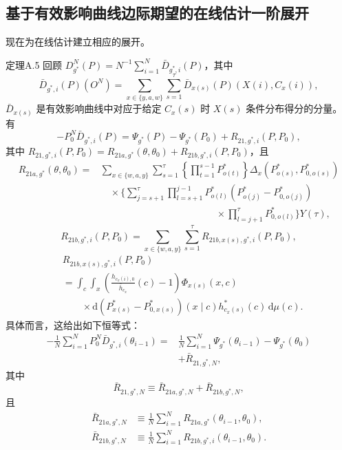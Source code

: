 
\subsection{基于有效影响曲线边际期望的在线估计一阶展开}

现在为在线估计建立相应的展开。

\begin{bookresult}{定理}{A.5}
回顾 $D^N_{g^*}(P)=N^{-1}\sum_{i=1}^N\bar D_{g^*,i}(P)$，其中
\[
\bar D_{g^*,i}(P)(O^N)
 =\sum_{x\in\{y,a,w\}}\sum_{s=1}^{\tau}\bar D_{x(s)}(P)(X(i),C_x(i)),
\]
$\bar D_{x(s)}$ 是有效影响曲线中对应于给定 $C_x(s)$ 时 $X(s)$ 条件分布得分的分量。
有
\[
-P_0^N\bar D_{g^*,i}(P)
 =\Psi_{g^*}(P)-\Psi_{g^*}(P_0)+R_{21,g^*,i}(P,P_0),
\]
其中 $R_{21,g^*,i}(P,P_0)=R_{21a,g^*}(\theta,\theta_0)+R_{21b,g^*,i}(P,P_0)$，且
\[
\begin{aligned}
R_{21a,g^*}(\theta,\theta_0)
={}&\sum_{x\in\{w,a,y\}}\sum_{s=1}^{\tau}
 \left\{\prod_{t=1}^{s-1}P^*_{o(t)}\right\}
 \Delta_x(P^*_{o(s)},P^*_{0,o(s)})\\
&\quad\times\Biggl\{\sum_{j=s+1}^{\tau}
 \prod_{l=s+1}^{j-1}P^*_{o(l)}(P^*_{o(j)}-P^*_{0,o(j)})\\
&\hspace{12em}\times\prod_{l=j+1}^{\tau}P^*_{0,o(l)}\Biggr\}Y(\tau),
\end{aligned}
\]
\[
R_{21b,g^*,i}(P,P_0)
 =\sum_{x\in\{w,a,y\}}\sum_{s=1}^{\tau}R_{21b,x(s),g^*,i}(P,P_0),
\]
\[
\begin{aligned}
&R_{21b,x(s),g^*,i}(P,P_0)\\
&=\int_c\int_x\left(\frac{h_{c_x(i),0}}{\bar h_{c_x}}(c)-1\right)
 \Phi_{x(s)}(x,c)\\
&\qquad\times\mathrm d(P^*_{x(s)}-P^*_{0,x(s)})(x\mid c)
 h^*_{c_x(s)}(c)\,\mathrm d\mu(c).
\end{aligned}
\]
具体而言，这给出如下恒等式：
\[
\begin{aligned}
-\frac1N\sum_{i=1}^NP_0^N\bar D_{g^*,i}(\theta_{i-1})
={}&\frac1N\sum_{i=1}^N\Psi_{g^*}(\theta_{i-1})-\Psi_{g^*}(\theta_0)\\
&+\bar R_{21,g^*,N},
\end{aligned}
\]
其中
\begin{equation}
\bar R_{21,g^*,N}\equiv\bar R_{21a,g^*,N}+\bar R_{21b,g^*,N},
\tag{A.14}
\end{equation}
且
\[
\begin{aligned}
\bar R_{21a,g^*,N}&\equiv\frac1N\sum_{i=1}^NR_{21a,g^*}(\theta_{i-1},\theta_0),\\
\bar R_{21b,g^*,N}&\equiv\frac1N\sum_{i=1}^NR_{21b,g^*,i}(\theta_{i-1},\theta_0).
\end{aligned}
\]
\end{bookresult}


